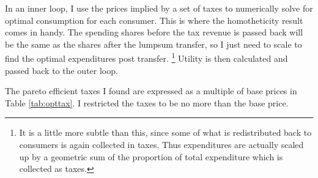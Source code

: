 \documentclass[12pt]{article}
\begin{document}
In an inner loop, I use the prices implied by a set of taxes to numerically solve for optimal consumption for each consumer.
This is where the homotheticity result comes in handy. The spending shares before the tax revenue is passed back will be the same as the shares after the lumpsum transfer, so I just need to scale to find the optimal expenditures post transfer. 
\footnote{It is a little more subtle than this, since some of what is redistributed back to consumers is again collected in taxes.
    Thus expenditures are actually scaled up by a geometric sum of the proportion of total expenditure which is collected as taxes. 
}
Utility is then calculated and passed back to the outer loop.

The pareto efficient taxes I found are expressed as a multiple of base prices in Table \ref{tab:opttax}. I restricted the taxes to be no more than the base price.
\end{document}
